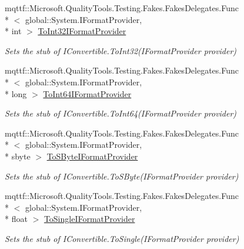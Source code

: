 \begin{DoxyCompactItemize}
mqttf\-::\-Microsoft.\-Quality\-Tools.\-Testing.\-Fakes.\-Fakes\-Delegates.\-Func\\*
$<$ global\-::\-System.\-I\-Format\-Provider, \\*
int $>$ \hyperlink{class_system_1_1_fakes_1_1_stub_i_convertible_aaac0a4a63883abd90b2ee054120bc7e6}{To\-Int32\-I\-Format\-Provider}
\begin{DoxyCompactList}\small\item\em Sets the stub of I\-Convertible.\-To\-Int32(\-I\-Format\-Provider provider)\end{DoxyCompactList}\item 
mqttf\-::\-Microsoft.\-Quality\-Tools.\-Testing.\-Fakes.\-Fakes\-Delegates.\-Func\\*
$<$ global\-::\-System.\-I\-Format\-Provider, \\*
long $>$ \hyperlink{class_system_1_1_fakes_1_1_stub_i_convertible_a95ba310c4e89e0294776d4c5ab426b1e}{To\-Int64\-I\-Format\-Provider}
\begin{DoxyCompactList}\small\item\em Sets the stub of I\-Convertible.\-To\-Int64(\-I\-Format\-Provider provider)\end{DoxyCompactList}\item 
mqttf\-::\-Microsoft.\-Quality\-Tools.\-Testing.\-Fakes.\-Fakes\-Delegates.\-Func\\*
$<$ global\-::\-System.\-I\-Format\-Provider, \\*
sbyte $>$ \hyperlink{class_system_1_1_fakes_1_1_stub_i_convertible_a7daf855c7a5132e7c5aae542b00b6d6a}{To\-S\-Byte\-I\-Format\-Provider}
\begin{DoxyCompactList}\small\item\em Sets the stub of I\-Convertible.\-To\-S\-Byte(\-I\-Format\-Provider provider)\end{DoxyCompactList}\item 
mqttf\-::\-Microsoft.\-Quality\-Tools.\-Testing.\-Fakes.\-Fakes\-Delegates.\-Func\\*
$<$ global\-::\-System.\-I\-Format\-Provider, \\*
float $>$ \hyperlink{class_system_1_1_fakes_1_1_stub_i_convertible_a64c3bf225ef4de15456b02dcb28125b9}{To\-Single\-I\-Format\-Provider}
\begin{DoxyCompactList}\small\item\em Sets the stub of I\-Convertible.\-To\-Single(\-I\-Format\-Provider provider)\end{DoxyCompactList}\item 

\end{DoxyCompactItemize}
